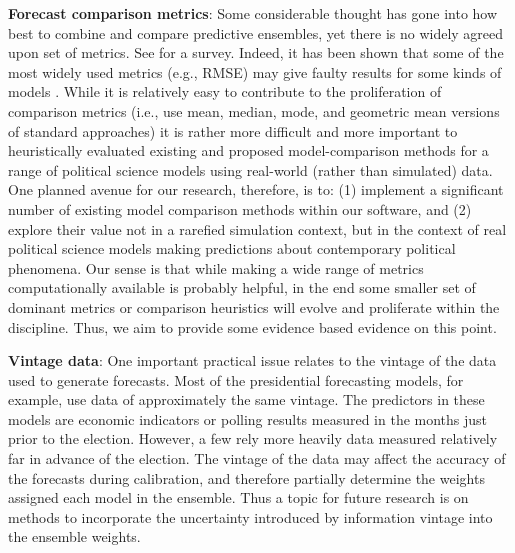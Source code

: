 \documentclass[pdftex,12pt,fullpage,oneside]{amsart}
\begin{document}
\textbf{Forecast comparison metrics}: Some considerable thought has
gone into how best to combine and compare predictive ensembles, yet
there is no widely agreed upon set of metrics. See
\citet{brandt:freeman:schrodt:2011} for a survey. Indeed, it has been
shown that some of the most widely used metrics (e.g., RMSE) may give
faulty results for some kinds of models
\citep{geweke:amisano:2011}. While it is relatively easy to contribute
to the proliferation of comparison metrics (i.e., use mean, median,
mode, and geometric mean versions of standard approaches) it is rather
more difficult and more important to heuristically evaluated existing
and proposed model-comparison methods for a range of political science
models using real-world (rather than simulated) data. One planned
avenue for our research, therefore, is to: (1) implement a significant
number of existing model comparison methods within our software, and
(2) explore their value not in a rarefied simulation context, but in
the context of real political science models making predictions about
contemporary political phenomena. Our sense is that while making a
wide range of metrics computationally available is probably helpful,
in the end some smaller set of dominant metrics or comparison
heuristics will evolve and proliferate within the discipline. Thus, we
aim to provide some evidence based evidence on this point.


\textbf{Vintage data}: One important practical issue relates to the
vintage of the data used to generate forecasts.  Most of the
presidential forecasting models, for example, use data of
approximately the same vintage.  The predictors in these models are
economic indicators or polling results measured in the months just
prior to the election.  However, a few rely more heavily data measured
relatively far in advance of the election. The vintage of the data may
affect the accuracy of the forecasts during calibration, and therefore
partially determine the weights assigned each model in the ensemble.
Thus a topic for future research is on methods to incorporate the
uncertainty introduced by information vintage into the ensemble
weights.
\end{document}
